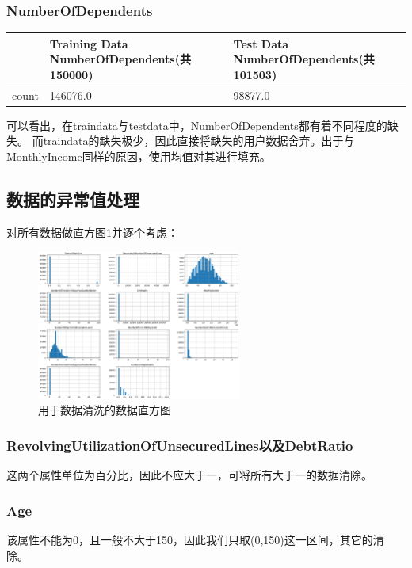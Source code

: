 \documentclass[UTF8,a4paper,10pt]{ctexart}
\begin{document}
\subsubsection{NumberOfDependents}
\begin{tabular}{|r|l|l|}
	\hline
	      & Training Data NumberOfDependents(共150000) & Test Data NumberOfDependents(共101503) \\ \hline
	count & 146076.0                                   & 98877.0                                \\ \hline
\end{tabular}\newline


可以看出，在traindata与testdata中，NumberOfDependents都有着不同程度的缺失。
而traindata的缺失极少，因此直接将缺失的用户数据舍弃。出于与MonthlyIncome同样的原因，使用均值对其进行填充。

\subsection{数据的异常值处理}
对所有数据做直方图\ref*{1}并逐个考虑：
\begin{figure}[htbp]
	\centering
	\includegraphics[width=0.6\textwidth]{zhifang.png} %
	\caption{用于数据清洗的数据直方图} %
	\label{1} %
\end{figure}
\subsubsection{RevolvingUtilizationOfUnsecuredLines以及DebtRatio}
这两个属性单位为百分比，因此不应大于一，可将所有大于一的数据清除。
\subsubsection{Age}
该属性不能为0，且一般不大于150，因此我们只取(0,150)这一区间，其它的清除。
\end{document}
